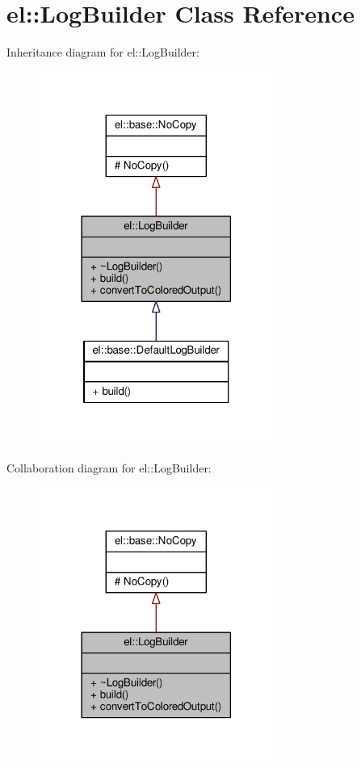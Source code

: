 \hypertarget{classel_1_1LogBuilder}{}\section{el\+:\+:Log\+Builder Class Reference}
\label{classel_1_1LogBuilder}


Inheritance diagram for el\+:\+:Log\+Builder\+:
\nopagebreak
\begin{figure}[H]
\begin{center}
\leavevmode
\includegraphics[width=218pt]{da/d85/classel_1_1LogBuilder__inherit__graph}
\end{center}
\end{figure}


Collaboration diagram for el\+:\+:Log\+Builder\+:
\nopagebreak
\begin{figure}[H]
\begin{center}
\leavevmode
\includegraphics[width=218pt]{d4/d90/classel_1_1LogBuilder__coll__graph}
\end{center}
\end{figure}
